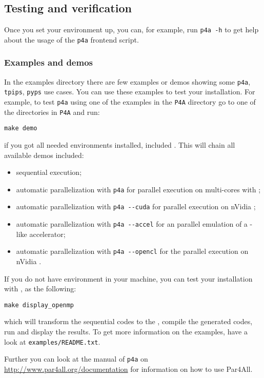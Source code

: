 \documentclass[a4paper]{article}
\begin{document}
\subsection{Testing and verification}

Once you set your environment up, you can, for example, run \texttt{p4a -h}
to get help about the usage of the \texttt{p4a} frontend script.


\subsubsection{Examples and demos}

In the examples directory there are few examples or demos showing some
\texttt{p4a}, \texttt{tpips}, \texttt{pyps} use cases. You can use these
examples to test your installation.  For example, to test \texttt{p4a}
using one of the examples in the \texttt{P4A} directory go to one of the
directories in \texttt{P4A} and run:
\begin{verbatim}
make demo
\end{verbatim}
if you got all needed environments installed, included \Acuda. This will
chain all available demos included:
\begin{itemize}
\item sequential execution;
\item automatic parallelization with \texttt{p4a} for parallel execution
  on multi-cores with \Aopenmp;
\item automatic parallelization with \verb|p4a --cuda| for parallel
  execution on nVidia \Agpu;
\item automatic parallelization with \verb|p4a --accel| for an \Aopenmp
  parallel emulation of a \Agpu-like accelerator;
\item automatic parallelization with \verb|p4a --opencl| for the \Aopencl
  parallel execution on nVidia \Agpu.
\end{itemize}

If you do not have \Acuda environment in your machine, you can test your
installation with \Aopenmp, as the following:
\begin{verbatim}
make display_openmp
\end{verbatim}
which will transform the sequential codes to the \Aopenmp, compile the
generated codes, run and display the results.  To get more information on
the examples, have a look at \texttt{examples/README.txt}.

Further you can look at the manual of \texttt{p4a} on
\url{http://www.par4all.org/documentation} for information on how to use Par4All.
\end{document}
